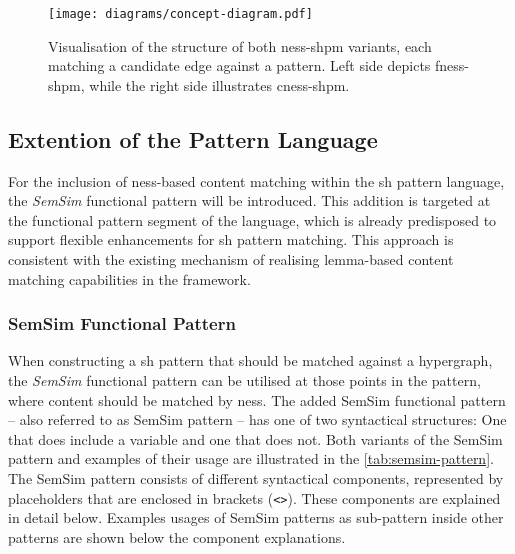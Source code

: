 \documentclass[11pt]{scrreprt}
\begin{document}
\begin{figure}
\centering
\texttt{[image: diagrams/concept-diagram.pdf]}
\caption{Visualisation of the structure of both \gls{ness-shpm} variants, each matching a candidate edge against a pattern. Left side depicts \gls{fness-shpm}, while the right side illustrates \gls{cness-shpm}.}
\label{fig:concept-diagram}
\end{figure}



\subsection{Extention of the Pattern Language}
\label{sec:extension-pattern-language}
For the inclusion of \gls{ness}-based content matching within the \gls{sh} pattern language, the \textit{SemSim} functional pattern will be introduced. This addition is targeted at the functional pattern segment of the language, which is already predisposed to support flexible enhancements for \gls{sh} pattern matching. This approach is consistent with the existing mechanism of realising lemma-based content matching capabilities in the framework.


\subsubsection{SemSim Functional Pattern}
When constructing a \gls{sh} pattern that should be matched against a hypergraph, the \textit{SemSim} functional pattern can be utilised at those points in the pattern, where content should be matched by \gls{ness}. The added SemSim functional pattern -- also referred to as SemSim pattern -- has one of two syntactical structures: One that does include a variable and one that does not. 
Both variants of the SemSim pattern and examples of their usage are illustrated in the \cref{tab:semsim-pattern}. The SemSim pattern consists of different syntactical components, represented by placeholders that are enclosed in brackets (\texttt{<>}). These components are explained in detail below. Examples usages of SemSim patterns as sub-pattern inside other patterns are shown below the component explanations.
\end{document}
